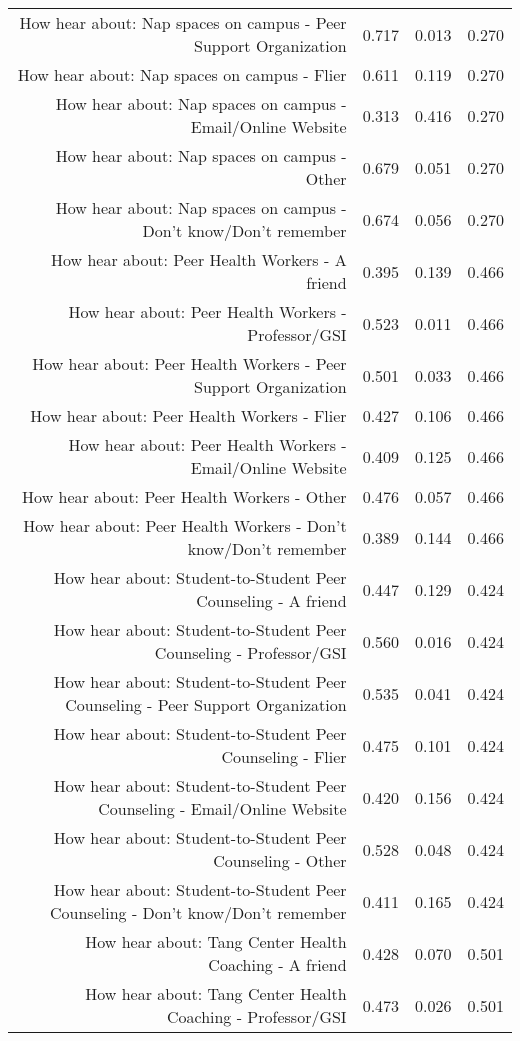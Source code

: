 \documentclass{article}\usepackage[]{graphicx}\usepackage[]{color}
\begin{document}
\begin{table}[H]
{\begin{tabular}{rrrr}
  How hear about: Nap spaces on campus - Peer Support Organization & 0.717 & 0.013 & 0.270 \\ 
  How hear about: Nap spaces on campus - Flier & 0.611 & 0.119 & 0.270 \\ 
  How hear about: Nap spaces on campus - Email/Online Website & 0.313 & 0.416 & 0.270 \\ 
  How hear about: Nap spaces on campus - Other & 0.679 & 0.051 & 0.270 \\ 
  How hear about: Nap spaces on campus - Don't know/Don't remember & 0.674 & 0.056 & 0.270 \\ 
  How hear about: Peer Health Workers - A friend & 0.395 & 0.139 & 0.466 \\ 
  How hear about: Peer Health Workers - Professor/GSI & 0.523 & 0.011 & 0.466 \\ 
  How hear about: Peer Health Workers - Peer Support Organization & 0.501 & 0.033 & 0.466 \\ 
  How hear about: Peer Health Workers - Flier & 0.427 & 0.106 & 0.466 \\ 
  How hear about: Peer Health Workers - Email/Online Website & 0.409 & 0.125 & 0.466 \\ 
  How hear about: Peer Health Workers - Other & 0.476 & 0.057 & 0.466 \\ 
  How hear about: Peer Health Workers - Don't know/Don't remember & 0.389 & 0.144 & 0.466 \\ 
  How hear about: Student-to-Student Peer Counseling - A friend & 0.447 & 0.129 & 0.424 \\ 
  How hear about: Student-to-Student Peer Counseling - Professor/GSI & 0.560 & 0.016 & 0.424 \\ 
  How hear about: Student-to-Student Peer Counseling - Peer Support Organization & 0.535 & 0.041 & 0.424 \\ 
  How hear about: Student-to-Student Peer Counseling - Flier & 0.475 & 0.101 & 0.424 \\ 
  How hear about: Student-to-Student Peer Counseling - Email/Online Website & 0.420 & 0.156 & 0.424 \\ 
  How hear about: Student-to-Student Peer Counseling - Other & 0.528 & 0.048 & 0.424 \\ 
  How hear about: Student-to-Student Peer Counseling - Don't know/Don't remember & 0.411 & 0.165 & 0.424 \\ 
  How hear about: Tang Center Health Coaching - A friend & 0.428 & 0.070 & 0.501 \\ 
  How hear about: Tang Center Health Coaching - Professor/GSI & 0.473 & 0.026 & 0.501 \\ 

\end{tabular}}
\end{table}
\end{document}

